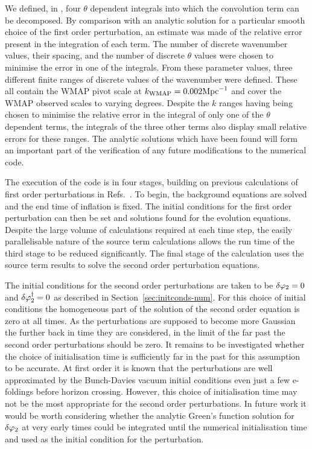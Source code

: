 We defined, in , four $\theta$ dependent integrals
into which the convolution term can be decomposed. By comparison with an analytic
solution for a particular smooth choice of the first order perturbation, an estimate
was made of the relative error present in the integration of each term. The
number of discrete wavenumber values, their spacing, and the number of discrete
$\theta$ values were chosen to minimise the error in one of the integrals. From
these parameter values, three
different finite ranges of discrete values of the wavenumber were defined.
These all contain the WMAP pivot scale at $k_\mathrm{WMAP}=0.002\mathrm{Mpc}^{-1}$ and cover the
WMAP observed scales to varying degrees.
% 
Despite the $k$ ranges having being chosen to minimise the relative error in the
integral of only
one of the $\theta$ dependent terms, the integrals of the three other terms also
display small relative errors for these ranges. 
% 
The analytic solutions which have been found will form an
important part of the verification of any future modifications to the
numerical code. 



The execution of the code is in four stages, building on previous calculations of
first order perturbations in Refs.~\cite{Martin:2006rs, Ringeval:2007am,
Salopek:1988qh}. To begin, the background equations are solved and the end time of
inflation is fixed. The initial conditions for the first order perturbation can then
be set and solutions found for the evolution equations.
Despite the large volume of calculations required at each
time step, the easily parallelisable nature of the source term calculations allows
the run time of the third stage to be reduced significantly. 
The final stage of the calculation uses the source term results to solve the second
order perturbation equations.
% 

The initial conditions for the second order perturbations are taken to be $\delta\varphi_{2}=0$ and
$\delta\varphi_{2}^{\dagger}=0$ as described in Section~\ref{sec:initconds-num}. For this choice of initial
conditions the homogeneous part of the solution of the second order equation is zero at all times.
As the perturbations are supposed to become more Gaussian the further back in time they are
considered, in the limit of the far past the second order perturbations should be zero. It remains
to be investigated whether the choice of initialisation time is sufficiently far in the past for
this assumption to be accurate. At first order it is known that the perturbations are well
 approximated by the Bunch-Davies vacuum initial conditions even just a few e-foldings before
horizon crossing. However, this choice of initialisation time may not be the most appropriate for
the second order perturbations. In future work it would be worth considering whether the analytic
Green's function solution for $\delta\varphi_{2}$ at very early times could be integrated until the numerical
initialisation time and used as the initial condition for the perturbation. 


